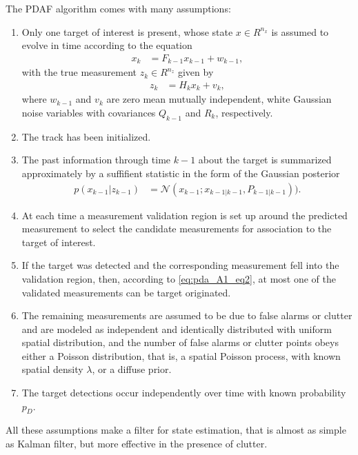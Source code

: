 The PDAF algorithm comes with many assumptions:
\begin{enumerate}
    \item Only one target of interest is present, whose state $x \in R^{n_x}$ is assumed to evolve in time according to the equation
        \begin{align}
            x_k &= F_{k-1} x_{k-1} + w_{k-1},
        \end{align}
        with the true measurement $z_k \in R^{n_z}$ given by
        \begin{align}
            \label{eq:pda_A1_eq2}
            z_k &= H_k x_k + v_k,
        \end{align}
        where $w_{k-1}$ and $v_k$ are zero mean mutually independent, white Gaussian noise variables with covariances $Q_{k-1}$ and $R_k$, respectively.
    \item The track has been initialized.
    \item The past information through time $k-1$ about the target is summarized approximately by a suffifient statistic in the form of the Gaussian posterior
        \begin{align}
            p(x_{k-1}|z_{k-1}) &= \mathcal{N}(x_{k-1}; x_{k-1|k-1}, P_{k-1|k-1})). \label{eq:pda_A3}
        \end{align}
    \item At each time a measurement validation region is set up around the predicted measurement to select the candidate measurements for association to the target of interest.
    \item If the target was detected and the corresponding
    measurement fell into the validation region, then,
    according to \eqref{eq:pda_A1_eq2}, at most one of the validated measurements can be target originated.
    \item The remaining measurements are assumed to be due
    to false alarms or clutter and are modeled as independent and identically distributed with uniform spatial distribution, and the number of false alarms or clutter points obeys either a Poisson distribution, that is, a spatial Poisson process, with known
    spatial density $\lambda$, or a diffuse prior.
    \item The target detections occur independently over time
    with known probability $p_D$.
\end{enumerate}
All these assumptions make a filter for state estimation, that is almost as simple as Kalman filter, but more effective in the presence of clutter.

